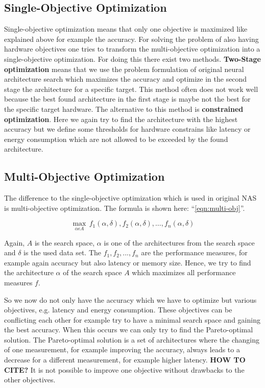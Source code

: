 \documentclass[conference]{IEEEtran}
\begin{document}
\subsection{Single-Objective Optimization}

Single-objective optimization means that only one objective is maximized like explained above for example the accuracy. For solving the problem of also having hardware objectives one tries to transform the multi-objective optimization into a single-objective optimization. For doing this there exist two methods. \textbf{Two-Stage optimization} means that we use the problem formulation of original neural architecture search which maximizes the accuracy and optimize in the second stage the architecture for a specific target. This method often does not work well because the best found architecture in the first stage is maybe not the best for the specific target hardware. The alternative to this method is \textbf{constrained optimization}. Here we again try to find the architecture with the highest accuracy but we define some thresholds for hardware constrains like latency or energy consumption which are not allowed to be exceeded by the found architecture. 

\subsection{Multi-Objective Optimization}

The difference to the single-objective optimization which is used in original NAS is multi-objective optimization. The formula is shown here: ``\eqref{eqn:multi-obj}''.
 
\begin{equation}
\label{eqn:multi-obj}
\max_{\alpha\epsilon A}\,f_{1}(\alpha, \delta),f_{2}(\alpha, \delta),\ldots ,f_{n}(\alpha, \delta)
\end{equation}     

Again, $A$ is the search space, $\alpha$ is one of the architectures from the search space and $\delta$ is the used data set. The $f_{1}, f_{2}, ..., f_{n}$ are the performance measures, for example again accuracy but also latency or memory size. Hence, we try to find the architecture $\alpha$ of the search space $A$ which maximizes all performance measures $f$. 

So we now do not only have the accuracy which we have to optimize but various objectives, e.g. latency and energy consumption. These objectives can be conflicting each other for example try to have a minimal search space and gaining the best accuracy. When this occurs we can only try to find the Pareto-optimal solution. The Pareto-optimal solution is a set of architectures where the changing of one measurement, for example improving the accuracy, always leads to a decrease for a different measurement, for example higher latency. \textbf{HOW TO CITE?} It is not possible to improve one objective without drawbacks to the other objectives.
\end{document}
